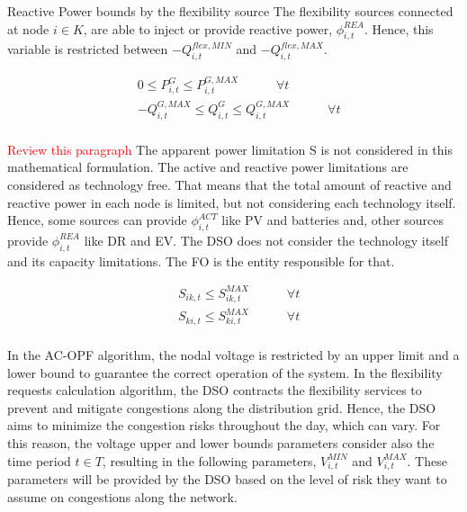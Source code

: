 Reactive Power bounds by the flexibility source
The flexibility sources connected at node $i \in K$, are able to inject or provide reactive power, $\phi_{i,t}^{REA}$. Hence, this variable is restricted between $-Q_{i,t}^{flex,MIN}$ and $-Q_{i,t}^{flex,MAX}$.

\begin{subequations}
\begin{align*}
&  0 \leq P_{i,t}^{G} \leq P_{i,t}^{G,MAX}  \quad   \qquad  \forall t  \\
&  - Q_{i,t}^{G,MAX} \leq Q_{i,t}^{G} \leq Q_{i,t}^{G,MAX}  \quad   \qquad  \forall t \\
\end{align*}
\end{subequations}

\textcolor{red}{Review this paragraph}
The apparent power limitation S is not considered in this mathematical formulation. The active and reactive power limitations are considered as technology free. That means that the total amount of reactive and reactive power in each node is limited, but not considering each technology itself. Hence, some sources can provide $\phi_{i,t}^{ACT}$ like PV and  batteries and, other sources provide $\phi_{i,t}^{REA}$ like DR and EV. The DSO does not consider the technology itself and its capacity limitations. The FO is the entity  responsible for that. 

\begin{subequations}
\begin{align*}
&  S_{ik,t} \leq S_{ik,t}^{MAX}  \quad   \qquad  \forall t  \\
&  S_{ki,t} \leq S_{ki,t}^{MAX}  \quad   \qquad  \forall t  \\ 
\end{align*}
\end{subequations}

In the AC-OPF algorithm, the nodal voltage is restricted by an upper limit and a lower bound to guarantee the correct operation of the system. In the flexibility requests calculation algorithm, the DSO contracts the flexibility services to prevent and mitigate congestions along the distribution grid. Hence, the DSO aims to minimize the congestion risks throughout the day, which can vary. For this reason, the voltage upper and lower bounds parameters consider also the time period $t \in T$, resulting in the following parameters, $V_{i,t}^{MIN}$ and $V_{i,t}^{MAX}$. These parameters will be provided by the DSO based on the level of risk they want to assume on congestions along the network.

